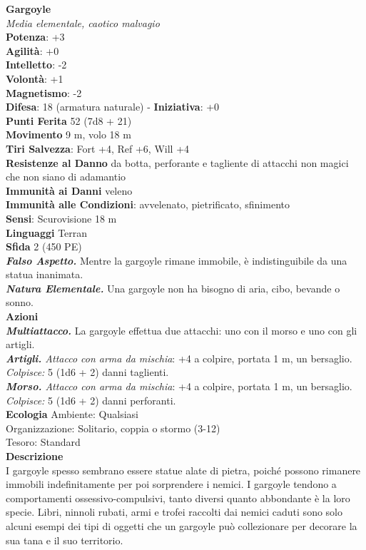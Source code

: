 \begin{multicols}{2}
\medskip\textbf{Gargoyle}\\
\emph{Media elementale, caotico malvagio}\\
\textbf{Potenza}: +3\\
\textbf{Agilità}: +0\\
\textbf{Intelletto}: -2\\
\textbf{Volontà}: +1\\
\textbf{Magnetismo}: -2\\
\textbf{Difesa}: 18 (armatura naturale) - \textbf{Iniziativa}: +0\\
\textbf{Punti Ferita} 52 (7d8 + 21)\\
\textbf{Movimento} 9 m, volo 18 m\\
\textbf{Tiri Salvezza}: Fort +4, Ref +6, Will +4\\
\textbf{Resistenze al Danno} da botta, perforante e tagliente di attacchi non magici che non siano di adamantio\\
\textbf{Immunità ai Danni} veleno\\
\textbf{Immunità alle Condizioni}: avvelenato, pietrificato, sfinimento\\
\textbf{Sensi}: Scurovisione 18 m\\
\textbf{Linguaggi} Terran\\
\textbf{Sfida} 2 (450 PE)\smallskip\\
\emph{\textbf{Falso Aspetto.}} Mentre la gargoyle rimane immobile, è indistinguibile da una statua inanimata.\\
\emph{\textbf{Natura Elementale.}} Una gargoyle non ha bisogno di aria, cibo, bevande o sonno.\\
\smallskip\textbf{Azioni}\\
\emph{\textbf{Multiattacco.}} La gargoyle effettua due attacchi: uno con il morso e uno con gli artigli.\\
\emph{\textbf{Artigli.} Attacco con arma da mischia}: +4 a colpire, portata 1 m, un bersaglio.\\
\emph{Colpisce:} 5 (1d6 + 2) danni taglienti.\\
\emph{\textbf{Morso.} Attacco con arma da mischia}: +4 a colpire, portata 1 m, un bersaglio.\\
\emph{Colpisce:} 5 (1d6 + 2) danni perforanti.\\
\textbf{Ecologia}
Ambiente: Qualsiasi\\
Organizzazione: Solitario, coppia o stormo (3-12)\\
Tesoro: Standard\\
\textbf{Descrizione}\\
I gargoyle spesso sembrano essere statue alate di pietra, poiché possono rimanere immobili indefinitamente per poi sorprendere i nemici. I gargoyle tendono a comportamenti ossessivo-compulsivi, tanto diversi quanto abbondante è la loro specie. Libri, ninnoli rubati, armi e trofei raccolti dai nemici caduti sono solo alcuni esempi dei tipi di oggetti che un gargoyle può collezionare per decorare la sua tana e il suo territorio.\\


\end{multicols}
